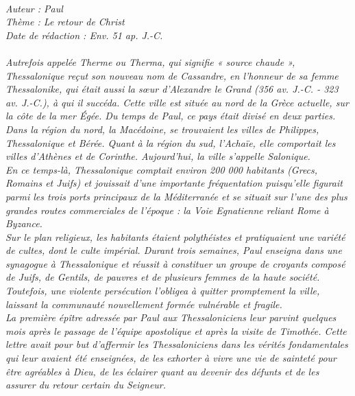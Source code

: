 \BFont
\noindent\hrulefill
{\footnotesize
\textit{
\bigskip
{\centering{}
\\Auteur : Paul
\\Thème : Le retour de Christ
\\Date de rédaction : Env. 51 ap. J.-C.\\}
}
\textit{
\\Autrefois appelée Therme ou Therma, qui signifie « source chaude », Thessalonique reçut son nouveau nom de Cassandre, en l'honneur de sa femme Thessalonike, qui était aussi la sœur d'Alexandre le Grand (356 av. J.-C. - 323 av. J.-C.), à qui il succéda. Cette ville est située au nord de la Grèce actuelle, sur la côte de la mer Égée. Du temps de Paul, ce pays était divisé en deux parties. Dans la région du nord, la Macédoine, se trouvaient les villes de Philippes, Thessalonique et Bérée. Quant à la région du sud, l'Achaïe, elle comportait les villes d'Athènes et de Corinthe. Aujourd'hui, la ville s'appelle Salonique.
\\En ce temps-là, Thessalonique comptait environ 200 000 habitants (Grecs, Romains et Juifs) et jouissait d'une importante fréquentation puisqu'elle figurait parmi les trois ports principaux de la Méditerranée et se situait sur l'une des plus grandes routes commerciales de l'époque : la Voie Egnatienne reliant Rome à Byzance.
\\Sur le plan religieux, les habitants étaient polythéistes et pratiquaient une variété de cultes, dont le culte impérial. Durant trois semaines, Paul enseigna dans une synagogue à Thessalonique et réussit à constituer un groupe de croyants composé de Juifs, de Gentils, de pauvres et de plusieurs femmes de la haute société. Toutefois, une violente persécution l'obligea à quitter promptement la ville, laissant la communauté nouvellement formée vulnérable et fragile.
\\La première épître adressée par Paul aux Thessaloniciens leur parvint quelques mois après le passage de l'équipe apostolique et après la visite de Timothée. Cette lettre avait pour but d'affermir les Thessaloniciens dans les vérités fondamentales qui leur avaient été enseignées, de les exhorter à vivre une vie de sainteté pour être agréables à Dieu, de les éclairer quant au devenir des défunts et de les assurer du retour certain du Seigneur.\bigskip
}
}
\par\nobreak\noindent\hrulefill
